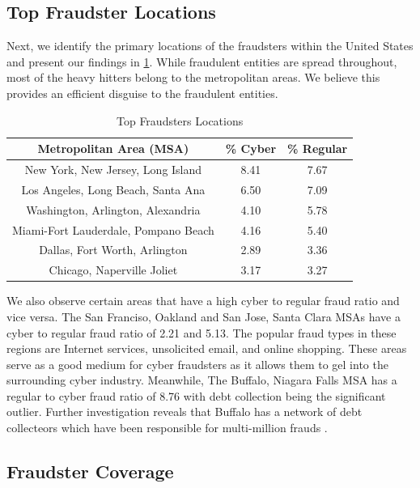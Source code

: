 \documentclass[conference]{IEEEtran}
\begin{document}
\subsection{Top Fraudster Locations}\label{fraudsters}
Next, we identify the primary locations of the fraudsters within the United States and present our findings in \ref{topareas}. While fraudulent entities are spread throughout, most of the heavy hitters belong to the metropolitan areas. We believe this provides an efficient disguise to the fraudulent entities.  

\begin{table}[h]
\centering
\begin{tabular}{c|c|c}
\hline
\bfseries Metropolitan Area (MSA) & \bfseries \% Cyber & \bfseries \% Regular\\
\hline
\hline
New York, New Jersey, Long Island & 8.41 & 7.67 \\
\hline
Los Angeles, Long Beach, Santa Ana & 6.50 & 7.09 \\
\hline
Washington, Arlington, Alexandria & 4.10 & 5.78 \\
\hline
Miami-Fort Lauderdale, Pompano Beach & 4.16 & 5.40 \\
\hline
Dallas, Fort Worth, Arlington & 2.89 & 3.36\\
\hline
Chicago, Naperville Joliet & 3.17 & 3.27 \\
\hline
\end{tabular}
\vspace{8pt}
\caption{Top Fraudsters Locations}\label{topareas}
\vspace{-15pt}
\end{table}

We also observe certain areas that have a high cyber to regular fraud ratio and vice versa. The San Franciso, Oakland and San Jose, Santa Clara MSAs have a cyber to regular fraud ratio of 2.21 and 5.13. The popular fraud types in these regions are Internet services, unsolicited email, and online shopping. These areas serve as a good medium for cyber fraudsters as it allows them to gel into the surrounding cyber industry. Meanwhile, The Buffalo, Niagara Falls MSA has a regular to cyber fraud ratio of 8.76 with debt collection being the significant outlier. Further investigation reveals that Buffalo has a network of debt collecteors which have been responsible for multi-million frauds \cite{buffalodebt1, buffalodebt2}.


\subsection{Fraudster Coverage}\label{fraudstercoverage}
\end{document}
